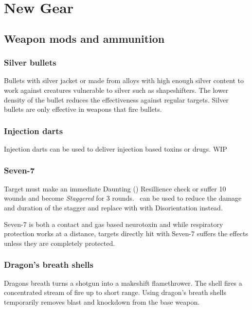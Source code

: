 \documentclass{book}
\begin{document}
\chapter{New Gear}
\section{Weapon mods and ammunition}
\begin{multicols}{2}
	\subsection{Silver bullets}\label{silver}
	Bullets with silver jacket or made from alloys with high enough silver content to work against creatures vulnerable to silver such as shapeshifters. The lower density of the bullet reduces the effectiveness against regular targets. Silver bullets are only effective in weapons that fire bullets.
	
	\subsection{Injection darts}
	Injection darts can be used to deliver injection based toxins or drugs. WIP
	
	\subsection{Seven-7}
	Target must make an immediate Daunting (\DifficultyDie \DifficultyDie \DifficultyDie \DifficultyDie) Resillience check or suffer 10 wounds and become \textit{Staggered} for 3 rounds. \Advantage\ can be used to reduce the damage and duration of the stagger and replace with with Disorientation instead. 
	
	Seven-7 is both a contact and gas based neurotoxin and while respiratory protection works at a distance, targets directly hit with Seven-7 suffers the effects unless they are completely protected.
	
	\subsection{Dragon's breath shells}
	Dragons breath turns a shotgun into a makeshift flamethrower. The shell fires a concentrated stream of fire up to short range. Using dragon's breath shells temporarily removes blast and knockdown from the base weapon. 
	
\end{multicols}
\end{document}
